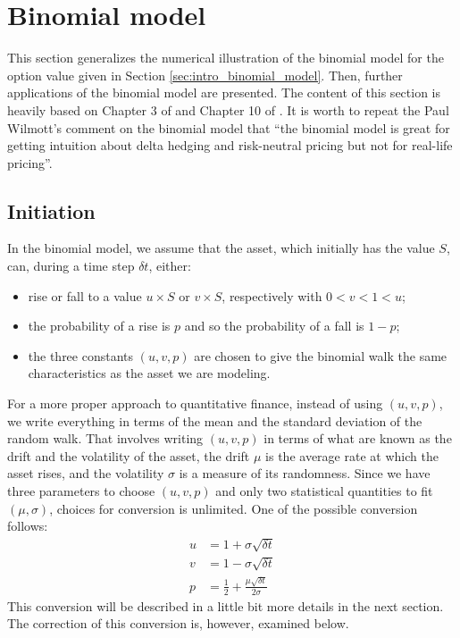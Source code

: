 \section{Binomial model}
\label{sec:binomial_tree}
This section generalizes the numerical illustration of the binomial model for the option value given in Section \ref{sec:intro_binomial_model}. Then, further applications of the binomial model are presented. The content of this section is heavily based on Chapter 3 of \cite{pw_iqf2ed_2007} and Chapter 10 of \cite{pw_mathfinderiv_1995}. It is worth to repeat the Paul Wilmott's comment on the binomial model that ``the binomial model is great for getting intuition about delta hedging and risk-neutral pricing but not for real-life pricing''.


\subsection{Initiation}
In the binomial model, we assume that the asset, which initially has the value $S$, can, during a time step $\delta t$, either:
\begin{itemize}
    \setlength\itemsep{0em}
    \item rise or fall to a value $u \times S$ or $v \times S$, respectively with $0 < v < 1 < u$;
    \item the probability of a rise is $p$ and so the probability of a fall is $1-p$;
    \item the three constants $(u,v,p)$ are chosen to give the binomial walk the same characteristics as the asset we are modeling.
\end{itemize}

For a more proper approach to quantitative finance, instead of using $(u,v,p)$, we write everything in terms of the mean and the standard deviation of the random walk. That involves writing $(u,v,p)$ in terms of what are known as the drift and the volatility of the asset, the drift $\mu$ is the average rate at which the asset rises, and the volatility $\sigma$ is a measure of its randomness. Since we have three parameters to choose $(u,v,p)$ and only two statistical quantities to fit $(\mu,\sigma)$, choices for conversion is unlimited. One of the possible conversion follows:
\begin{align}
    u &= 1 + \sigma \sqrt{\delta t} \\
    v &= 1 - \sigma \sqrt{\delta t} \\
    p &= \frac{1}{2} + \frac{\mu \sqrt{\delta t}}{2 \sigma}    
\end{align}
This conversion will be described in a little bit more details in the next section. The correction of this conversion is, however, examined below.

